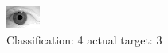 \begin{figure}[h!]
\begin{center}
\includegraphics[width=0.60\columnwidth]{figures/ID2062_class_4_target_3.png}
\end{center}
\caption{ Classification: 4 actual target: 3}
\label{fig:ID2062_class_4_target_3}
\end{figure}
